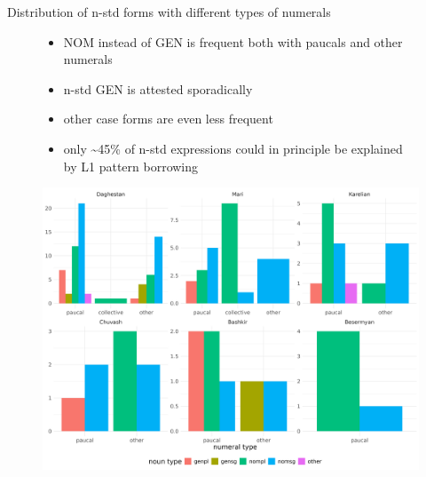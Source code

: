 \documentclass[
  ignorenonframetext,
  t]{beamer}
\providecommand{\tightlist}{%
  \setlength{\itemsep}{0pt}\setlength{\parskip}{0pt}}\usepackage{longtable,booktabs,array}
\begin{document}
\begin{frame}{Distribution of n-std forms with different types of
numerals}
\label{distribution-of-n-std-forms-with-different-types-of-numerals}
\begin{figure}

\begin{minipage}{0.35\linewidth}

\begin{itemize}
\tightlist
\item
  NOM instead of GEN is frequent both with paucals and other numerals
\item
  n-std GEN is attested sporadically
\item
  other case forms are even less frequent
\item
  only \textasciitilde45\% of n-std expressions could in principle be
  explained by L1 pattern borrowing
\end{itemize}

\end{minipage}%
%
\begin{minipage}{0.65\linewidth}

\begin{center}
\includegraphics[width=1.1\textwidth,height=\textheight]{images/l2_num_constr_distribution_of_nstd_forms_with_different_types_of_numerals.png}
\end{center}

\end{minipage}%

\end{figure}%
\end{frame}
\end{document}
